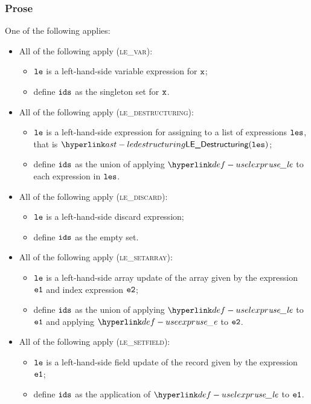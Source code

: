 \subsubsection{Prose}
One of the following applies:
\begin{itemize}
  \item All of the following apply (\textsc{le\_var}):
  \begin{itemize}
    \item $\texttt{le}$ is a left-hand-side variable expression for $\texttt{x}$;
    \item define $\texttt{ids}$ as the singleton set for $\texttt{x}$.
  \end{itemize}

  \item All of the following apply (\textsc{le\_destructuring}):
  \begin{itemize}
    \item $\texttt{le}$ is a left-hand-side expression for assigning to a list of expressions $\texttt{les}$,
          that is $\LEDestructuring(\vles)$;
    \item define $\texttt{ids}$ as the union of applying $\uselexpr$ to each expression in $\texttt{les}$.
  \end{itemize}

  \item All of the following apply (\textsc{le\_discard}):
  \begin{itemize}
    \item $\texttt{le}$ is a left-hand-side discard expression;
    \item define $\texttt{ids}$ as the empty set.
  \end{itemize}

  \item All of the following apply (\textsc{le\_setarray}):
  \begin{itemize}
    \item $\texttt{le}$ is a left-hand-side array update of the array given by the expression $\texttt{e1}$ and index expression $\texttt{e2}$;
    \item define $\texttt{ids}$ as the union of applying $\uselexpr$ to $\texttt{e1}$ and applying $\useexpr$ to $\texttt{e2}$.
  \end{itemize}

  \item All of the following apply (\textsc{le\_setfield}):
  \begin{itemize}
    \item $\texttt{le}$ is a left-hand-side field update of the record given by the expression $\texttt{e1}$;
    \item define $\texttt{ids}$ as the application of $\uselexpr$ to $\texttt{e1}$.
  \end{itemize}


\end{itemize}
